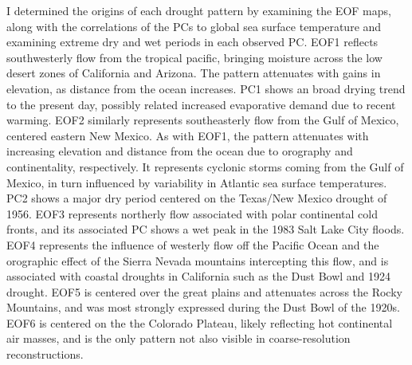 \documentclass[11pt]{iopart}
\begin{document}
I determined the origins of each drought pattern by examining the EOF maps, along with the correlations of the PCs to global sea surface temperature and examining extreme dry and wet periods in each observed PC. EOF1 reflects southwesterly flow from the tropical pacific, bringing moisture across the low desert zones of California and Arizona. The pattern attenuates with gains in elevation, as distance from the ocean increases. PC1 shows an broad drying trend to the present day, possibly related increased evaporative demand due to recent warming. EOF2 similarly represents southeasterly flow from the Gulf of Mexico, centered eastern New Mexico. As with EOF1, the pattern attenuates with increasing elevation and distance from the ocean due to orography and continentality, respectively. It represents cyclonic storms coming from the Gulf of Mexico, in turn influenced by variability in Atlantic sea surface temperatures. PC2 shows a major dry period centered on the Texas/New Mexico drought of 1956. EOF3 represents northerly flow associated with polar continental cold fronts, and its associated PC shows a wet peak in the 1983 Salt Lake City floods. EOF4 represents the influence of westerly flow off the Pacific Ocean and the orographic effect of the Sierra Nevada mountains intercepting this flow, and is associated with coastal droughts in California such as the Dust Bowl and 1924 drought. EOF5 is centered over the great plains and attenuates across the Rocky Mountains, and was most strongly expressed during the Dust Bowl of the 1920s. EOF6 is centered on the the Colorado Plateau, likely reflecting hot continental air masses, and is the only pattern not also visible in coarse-resolution reconstructions.


\end{document}

